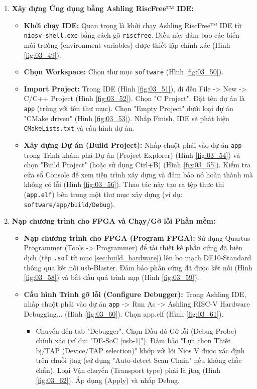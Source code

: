 \begin{enumerate}
\begin{itemize}
    \end{itemize}
    \item \textbf{Xây dựng Ứng dụng bằng Ashling RiscFree™ IDE:}
    \begin{itemize}
        \item \textbf{Khởi chạy IDE:} Quan trọng là khởi chạy Ashling RiscFree™ IDE từ \texttt{ niosv-shell.exe} bằng cách gõ \texttt{riscfree}. Điều này đảm bảo các biến môi trường (environment variables) được thiết lập chính xác (Hình \ref{fig:03_49}).
        \item \textbf{Chọn Workspace:} Chọn thư mục \texttt{software} (Hình \ref{fig:03_50}).
        \item \textbf{Import Project:} Trong IDE (Hình \ref{fig:03_51}), đi đến File -> New -> C/C++ Project (Hình \ref{fig:03_52}). Chọn "C Project". Đặt tên dự án là \texttt{app} (trùng với tên thư mục). Chọn "Empty Project" dưới loại dự án "CMake driven" (Hình \ref{fig:03_53}). Nhấp Finish. IDE sẽ phát hiện \texttt{CMakeLists.txt} và cấu hình dự án.
        \item \textbf{Xây dựng Dự án (Build Project):} Nhấp chuột phải vào dự án \texttt{app} trong Trình khám phá Dự án (Project Explorer) (Hình \ref{fig:03_54}) và chọn "Build Project" (hoặc sử dụng Ctrl+B) (Hình \ref{fig:03_55}). Kiểm tra cửa sổ Console để xem tiến trình xây dựng và đảm bảo nó hoàn thành mà không có lỗi (Hình \ref{fig:03_56}). Thao tác này tạo ra tệp thực thi (\texttt{app.elf}) bên trong một thư mục xây dựng (ví dụ: \texttt{software/app/build/Debug}). 
    \end{itemize}
    \item \textbf{Nạp chương trình cho FPGA và Chạy/Gỡ lỗi Phần mềm:}
    \begin{itemize}
        \item \textbf{Nạp chương trình cho FPGA (Program FPGA):} Sử dụng Quartus Programmer (Tools -> Programmer) để tải thiết kế phần cứng đã biên dịch (tệp \texttt{.sof} từ mục \ref{sec:build_hardware}) lên bo mạch DE10-Standard thông qua kết nối \acrshort{usb}-Blaster. Đảm bảo phần cứng đã được kết nối (Hình \ref{fig:03_58}) và bắt đầu quá trình nạp (Hình \ref{fig:03_59}).
        \item \textbf{Cấu hình Trình gỡ lỗi (Configure Debugger):} Trong Ashling IDE, nhấp chuột phải vào dự án \texttt{app} -> Run As -> Ashling RISC-V Hardware Debugging... (Hình \ref{fig:03_60}). Chọn app.elf (Hình \ref{fig:03_61}).
        \begin{itemize}
            \item Chuyển đến tab "Debugger". Chọn Đầu dò Gỡ lỗi (Debug Probe) chính xác (ví dụ: "DE-SoC [\acrshort{usb}-1]"). Đảm bảo "Lựa chọn Thiết bị/TAP (Device/TAP selection)" khớp với lõi Nios V được xác định trên chuỗi \acrshort{jtag} (sử dụng "Auto-detect Scan Chain" nếu không chắc chắn). Loại Vận chuyển (Transport type) phải là \acrshort{jtag} (Hình \ref{fig:03_62}). Áp dụng (Apply) và nhấp Debug.

\end{itemize}
\end{itemize}
\end{enumerate}
